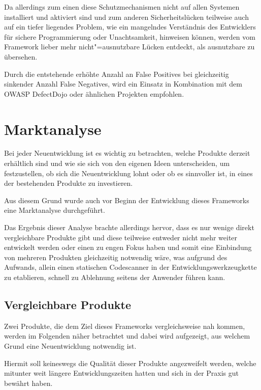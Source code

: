         Da allerdings zum einen diese Schutzmechanismen nicht auf allen Systemen installiert und
        aktiviert sind und
        zum anderen Sicherheitslücken teilweise auch auf ein tiefer liegendes Problem,
        wie ein mangelndes Verständnis des Entwicklers für sichere Programmierung oder
        Unachtsamkeit,
        hinweisen können,
        werden vom Framework lieber mehr nicht"=ausnutzbare Lücken entdeckt,
        als ausnutzbare zu übersehen.

        Durch die entstehende erhöhte Anzahl an False Positives bei gleichzeitig sinkender Anzahl False Negatives,
        wird ein Einsatz in Kombination mit dem OWASP DefectDojo\cite{Anderson2018} oder
        ähnlichen Projekten empfohlen.

    \section{Marktanalyse}
        Bei jeder Neuentwicklung ist es wichtig zu betrachten,
        welche Produkte derzeit erhältlich sind und
        wie sie sich von den eigenen Ideen unterscheiden,
        um festzustellen,
        ob sich die Neuentwicklung lohnt oder
        ob es sinnvoller ist,
        in eines der bestehenden Produkte zu investieren.

        Aus diesem Grund wurde auch vor Beginn der Entwicklung dieses Frameworks eine Marktanalyse durchgeführt.

        Das Ergebnis dieser Analyse brachte allerdings hervor,
        dass es nur wenige direkt vergleichbare Produkte gibt und
        diese teilweise entweder nicht mehr weiter entwickelt werden oder
        einen zu engen Fokus haben und
        somit eine Einbindung von mehreren Produkten gleichzeitig notwendig wäre,
        was aufgrund des Aufwands,
        allein einen statischen Codescanner in der Entwicklungswerkzeugkette zu etablieren,
        schnell zu Ablehnung seitens der Anwender führen kann.

        \subsection{Vergleichbare Produkte}
            Zwei Produkte,
            die dem Ziel dieses Frameworks vergleichsweise nah kommen,
            werden im Folgenden näher betrachtet und
            dabei wird aufgezeigt,
            aus welchem Grund eine Neuentwicklung notwendig ist.

            Hiermit soll keineswegs die Qualität dieser Produkte angezweifelt werden,
            welche mitunter weit längere Entwicklungszeiten hatten und
            sich in der Praxis gut bewährt haben.

